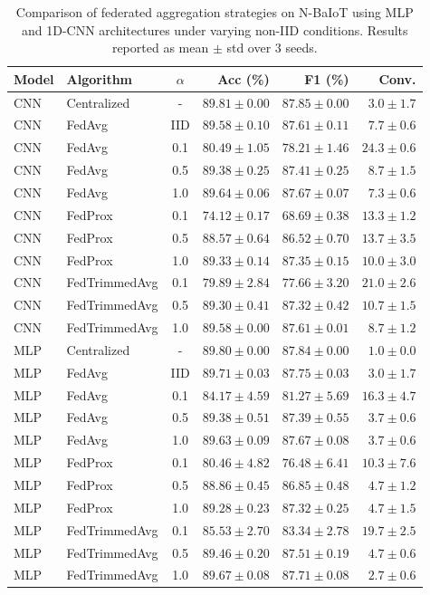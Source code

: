 \begin{table}
\caption{Comparison of federated aggregation strategies on N-BaIoT using MLP and 1D-CNN architectures under varying non-IID conditions. Results reported as mean $\pm$ std over 3 seeds.}
\label{tab:fl_results}
\begin{tabular}{llcrrr}
\toprule
Model & Algorithm & $\alpha$ & Acc (\%) & F1 (\%) & Conv. \\
\midrule
CNN & Centralized & - & $89.81 \pm 0.00$ & $87.85 \pm 0.00$ & $3.0 \pm 1.7$ \\
CNN & FedAvg & IID & $89.58 \pm 0.10$ & $87.61 \pm 0.11$ & $7.7 \pm 0.6$ \\
CNN & FedAvg & 0.1 & $80.49 \pm 1.05$ & $78.21 \pm 1.46$ & $24.3 \pm 0.6$ \\
CNN & FedAvg & 0.5 & $89.38 \pm 0.25$ & $87.41 \pm 0.25$ & $8.7 \pm 1.5$ \\
CNN & FedAvg & 1.0 & $89.64 \pm 0.06$ & $87.67 \pm 0.07$ & $7.3 \pm 0.6$ \\
CNN & FedProx & 0.1 & $74.12 \pm 0.17$ & $68.69 \pm 0.38$ & $13.3 \pm 1.2$ \\
CNN & FedProx & 0.5 & $88.57 \pm 0.64$ & $86.52 \pm 0.70$ & $13.7 \pm 3.5$ \\
CNN & FedProx & 1.0 & $89.33 \pm 0.14$ & $87.35 \pm 0.15$ & $10.0 \pm 3.0$ \\
CNN & FedTrimmedAvg & 0.1 & $79.89 \pm 2.84$ & $77.66 \pm 3.20$ & $21.0 \pm 2.6$ \\
CNN & FedTrimmedAvg & 0.5 & $89.30 \pm 0.41$ & $87.32 \pm 0.42$ & $10.7 \pm 1.5$ \\
CNN & FedTrimmedAvg & 1.0 & $89.58 \pm 0.00$ & $87.61 \pm 0.01$ & $8.7 \pm 1.2$ \\
MLP & Centralized & - & $89.80 \pm 0.00$ & $87.84 \pm 0.00$ & $1.0 \pm 0.0$ \\
MLP & FedAvg & IID & $89.71 \pm 0.03$ & $87.75 \pm 0.03$ & $3.0 \pm 1.7$ \\
MLP & FedAvg & 0.1 & $84.17 \pm 4.59$ & $81.27 \pm 5.69$ & $16.3 \pm 4.7$ \\
MLP & FedAvg & 0.5 & $89.38 \pm 0.51$ & $87.39 \pm 0.55$ & $3.7 \pm 0.6$ \\
MLP & FedAvg & 1.0 & $89.63 \pm 0.09$ & $87.67 \pm 0.08$ & $3.7 \pm 0.6$ \\
MLP & FedProx & 0.1 & $80.46 \pm 4.82$ & $76.48 \pm 6.41$ & $10.3 \pm 7.6$ \\
MLP & FedProx & 0.5 & $88.86 \pm 0.45$ & $86.85 \pm 0.48$ & $4.7 \pm 1.2$ \\
MLP & FedProx & 1.0 & $89.28 \pm 0.23$ & $87.32 \pm 0.25$ & $4.7 \pm 1.5$ \\
MLP & FedTrimmedAvg & 0.1 & $85.53 \pm 2.70$ & $83.34 \pm 2.78$ & $19.7 \pm 2.5$ \\
MLP & FedTrimmedAvg & 0.5 & $89.46 \pm 0.20$ & $87.51 \pm 0.19$ & $4.7 \pm 0.6$ \\
MLP & FedTrimmedAvg & 1.0 & $89.67 \pm 0.08$ & $87.71 \pm 0.08$ & $2.7 \pm 0.6$ \\
\bottomrule
\end{tabular}
\end{table}

